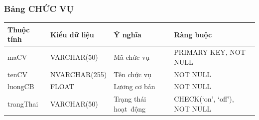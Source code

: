 \documentclass[a4paper,12pt]{report}
\begin{document}
\subsubsection{Bảng CHỨC VỤ}
\noindent
\begin{center}
    \begin{tabular}{|>{\centering\arraybackslash}p{3cm}|
        >{\centering\arraybackslash}p{4cm}|
        >{\centering\arraybackslash}p{4cm}|
        >{\centering\arraybackslash}p{4cm}|}
        \hline
        \textbf{Thuộc tính}                                                                                                               &
        \textbf{Kiểu dữ liệu}                                                                                                                             &
        \textbf{Ý nghĩa}                                                                                                 &
        \textbf{Ràng buộc}                                                                                                         \\
        \hline
        maCV &  VARCHAR(50)  & Mã chức vụ & PRIMARY KEY, NOT NULL \\
        \hline
        tenCV &  NVARCHAR(255)  & Tên chức vụ & NOT NULL \\                                                                                                                          
        \hline
        luongCB & FLOAT & Lương cơ bản & NOT NULL \\                                                                                                                          
        \hline
        trangThai &  VARCHAR(50)  & Trạng thái hoạt~động & CHECK(‘on’, ‘off’), NOT NULL \\
        \hline
    \end{tabular}
\end{center}
\end{document}
